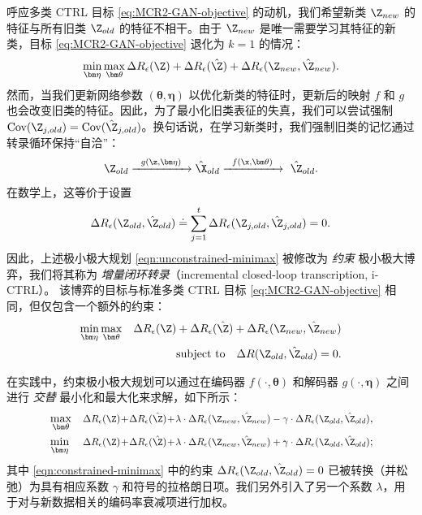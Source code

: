 \documentclass[../../book-main_zh.tex]{subfiles}
\begin{document}
呼应多类 CTRL 目标 \eqref{eq:MCR2-GAN-objective} 的动机，我们希望新类 $\Z_{new}$ 的特征与所有旧类 $\Z_{old}$ 的特征不相干。由于 $\Z_{new}$ 是唯一需要学习其特征的新类，目标 \eqref{eq:MCR2-GAN-objective} 退化为 $k=1$ 的情况：
\begin{equation}
    \min_{\bm \eta} \max_{\bm \theta} \Delta{R_\epsilon(\Z)} +
    \Delta{R_\epsilon(\hat{\Z})}+\Delta{R_\epsilon(\Z_{new},\hat{\Z}_{new})}.
    \label{eqn:unconstrained-minimax}
\end{equation}
然而，当我们更新网络参数 $(\bm \theta,\bm \eta)$ 以优化新类的特征时，更新后的映射 $f$ 和 $g$ 也会改变旧类的特征。因此，为了最小化旧类表征的失真，我们可以尝试强制 $\mbox{Cov}(\Z_{j,old}) = \mbox{Cov}(\hat{\Z}_{j,old})$。换句话说，在学习新类时，我们强制旧类的记忆通过转录循环保持“自洽”：
\begin{equation}
    \Z_{old} \xrightarrow{\hspace{2mm} g(\z,\bm \eta) \hspace{2mm}}
    \hat \X_{old} \xrightarrow{\hspace{2mm} f(\x, \bm
    \theta)\hspace{2mm}} \ \hat \Z_{old}.
\end{equation}
在数学上，这等价于设置
$$\Delta R_\epsilon(\Z_{old},\hat{\Z}_{old}) \doteq  \sum_{j=1}^t
\Delta R_\epsilon(\Z_{j,old},\hat{\Z}_{j,old}) = 0.$$
因此，上述极小极大规划 \eqref{eqn:unconstrained-minimax} 被修改为 {\em 约束} 极小极大博弈，我们将其称为 {\em 增量闭环转录}（incremental closed-loop transcription, i-CTRL）。
该博弈的目标与标准多类 CTRL 目标 \eqref{eq:MCR2-GAN-objective} 相同，但仅包含一个额外的约束：
\begin{eqnarray}
    \min_{\bm \eta} \max_{\bm \theta}
    &&\Delta{R_\epsilon(\Z)}+\Delta{R_\epsilon(\hat{\Z})}+\Delta{R_\epsilon(\Z_{new},\hat{\Z}_{new})}
    \nonumber\\
    && \mbox{subject to} \quad  \Delta R(\Z_{old},\hat{\Z}_{old}) = 0.
    \label{eqn:constrained-minimax}
\end{eqnarray}

在实践中，约束极小极大规划可以通过在编码器 $f(\cdot, \bm \theta)$ 和解码器 $g(\cdot, \bm \eta)$ 之间进行 {\em 交替} 最小化和最大化来求解，如下所示：
\begin{eqnarray}
    &\max_{\bm \theta}
    &\scalebox{0.87}{$\displaystyle\Delta{R_\epsilon(\Z)}\!+\!\Delta{R_\epsilon(\hat{\Z})}\!+\!\lambda\cdot
    \Delta{R_\epsilon(\Z_{new},\hat{\Z}_{new})} - \gamma\cdot
    \Delta{R_\epsilon(\Z_{old},\hat{\Z}_{old})}$}, \label{eqn:relaxed-max}\\
    &\min_{\bm \eta}
    &\scalebox{0.87}{$\displaystyle\Delta{R_\epsilon(\Z)}\!+\!\Delta{R_\epsilon(\hat{\Z})}\!+\!\lambda\cdot
    \Delta{R_\epsilon(\Z_{new},\hat{\Z}_{new})} + \gamma\cdot
    \Delta{R_\epsilon(\Z_{old},\hat{\Z}_{old})}$}; \label{eqn:relaxed-min}
\end{eqnarray}
其中 \eqref{eqn:constrained-minimax} 中的约束 $\Delta R_\epsilon(\Z_{old},\hat{\Z}_{old}) = 0$ 已被转换（并松弛）为具有相应系数 $\gamma$ 和符号的拉格朗日项。我们另外引入了另一个系数 $\lambda$，用于对与新数据相关的编码率衰减项进行加权。
\end{document}
